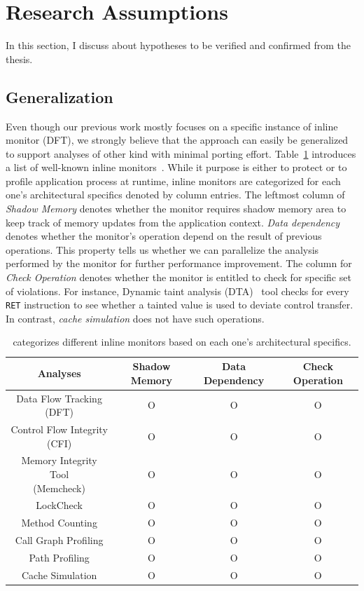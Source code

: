 \section{Research Assumptions} \label{sec:hypo} 

In this section, I discuss about hypotheses to be verified and confirmed
from the thesis.

\subsection{\sreplica Generalization}
\label{ssec:general}

Even though our previous work mostly focuses on a specific instance of inline
monitor (\ie DFT), we strongly believe that the approach can easily be
generalized to support analyses of other kind with minimal porting effort.
Table~\ref{tab:analyses} introduces a list of well-known inline
monitors~\cite{cab:oopsala2009}. While it purpose is either to protect or to
profile application process at runtime, inline monitors are categorized for
each one's architectural specifics denoted by column entries. The leftmost
column of {\it Shadow Memory} denotes whether the monitor requires shadow
memory area to keep track of memory updates from the application context. {\it
Data dependency} denotes whether the monitor's operation depend on the result
of previous operations. This property tells us whether we can parallelize the
analysis performed by the monitor for further performance improvement. The
column for {\it Check Operation} denotes whether the monitor is entitled to
check for specific set of violations. For instance, Dynamic taint analysis
(DTA)~\cite{taintcheck:ndss2005} tool checks for every {\tt RET} instruction to
see whether a tainted value is used to deviate control transfer. In contrast, {\it
cache simulation} does not have such operations.

\begin{table}[h]
    \centering
\begin{tabular}{|c|c|c|c|}
\hline
Analyses & Shadow Memory & Data Dependency & Check Operation \\ 
\hline \hline
Data Flow Tracking (DFT) & O & O & O \\ \hline
Control Flow Integrity (CFI) & O & O & O \\ \hline
\specialcell{Memory Integrity Tool \\ (Memcheck)} & O & O & O \\ \hline
LockCheck & O & O & O \\ \hline
Method Counting & O & O & O \\ \hline
Call Graph Profiling & O & O & O \\ \hline
Path Profiling & O & O & O \\ \hline
Cache Simulation & O & O & O \\ \hline
\end{tabular}
\caption{ categorizes different inline monitors based on each one's
architectural specifics. \label{tab:analyses}}
\end{table}

